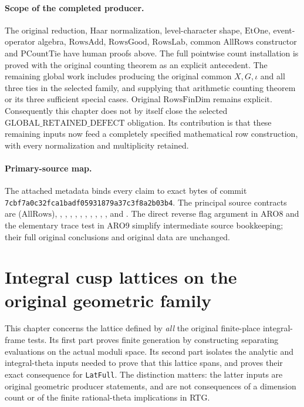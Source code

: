 \documentclass[11pt,a4paper]{article}
\numberwithin{equation}{section}
\theoremstyle{remark}\newtheorem{remark}[theorem]{Remark}
\begin{document}
\paragraph{Scope of the completed producer.}
The original reduction, Haar normalization, level-character shape,
\(\mathrm{EtOne}\), event-operator algebra, \(\mathrm{RowsAdd}\),
\(\mathrm{RowsGood}\), \(\mathrm{RowsLab}\), common
\(\mathrm{AllRows}\) constructor and \(\mathrm{PCountTie}\) have
human proofs above.  The full pointwise count installation is proved
with the original counting theorem as an explicit antecedent.
The remaining global work includes producing the original common
\(X,G,\iota\) and all three ties in the selected family, and
supplying that arithmetic counting theorem or its three sufficient
special cases.  Original \(\mathrm{RowsFinDim}\) remains explicit.
Consequently this chapter does not by itself close the selected
\(\mathrm{GLOBAL\_\allowbreak RETAINED\_\allowbreak DEFECT}\) obligation.  Its contribution
is that these remaining inputs now feed a completely specified
mathematical row construction, with every normalization and
multiplicity retained.

\paragraph{Primary-source map.}
The attached metadata binds every claim to exact bytes of commit
\texttt{7cbf7a0c32fca1badf05931879a37c3f8a2b03b4}.
The principal source contracts are 
(\(\mathrm{AllRows}\)), ,
, ,
, ,
, ,
, ,
, and .
The direct reverse flag argument in ARO8 and the elementary trace
test in ARO9 simplify intermediate source bookkeeping; their full
original conclusions and original data are unchanged.


\section{Integral cusp lattices on the original geometric family}
\label{sec:icl-v46}

This chapter concerns the lattice defined by \emph{all} the original
finite-place integral-frame tests.  Its first part proves finite generation
by constructing separating evaluations on the actual moduli space.  Its
second part isolates the analytic and integral-theta inputs needed to prove
that this lattice spans, and proves their exact consequence for
\texttt{Lat\allowbreak Full}.  The distinction matters: the latter inputs are original
geometric producer statements, and are not consequences of a dimension
count or of the finite rational-theta implications in RTG.
\end{document}
